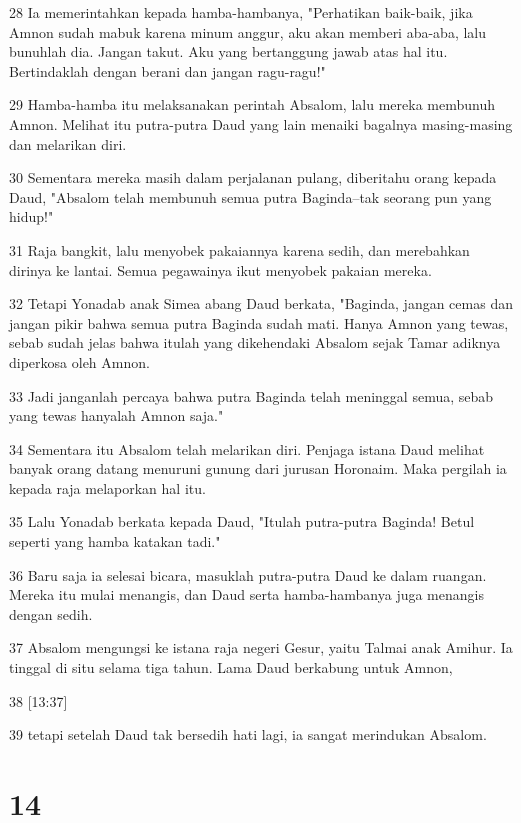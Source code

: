 \par 28 Ia memerintahkan kepada hamba-hambanya, "Perhatikan baik-baik, jika Amnon sudah mabuk karena minum anggur, aku akan memberi aba-aba, lalu bunuhlah dia. Jangan takut. Aku yang bertanggung jawab atas hal itu. Bertindaklah dengan berani dan jangan ragu-ragu!"
\par 29 Hamba-hamba itu melaksanakan perintah Absalom, lalu mereka membunuh Amnon. Melihat itu putra-putra Daud yang lain menaiki bagalnya masing-masing dan melarikan diri.
\par 30 Sementara mereka masih dalam perjalanan pulang, diberitahu orang kepada Daud, "Absalom telah membunuh semua putra Baginda--tak seorang pun yang hidup!"
\par 31 Raja bangkit, lalu menyobek pakaiannya karena sedih, dan merebahkan dirinya ke lantai. Semua pegawainya ikut menyobek pakaian mereka.
\par 32 Tetapi Yonadab anak Simea abang Daud berkata, "Baginda, jangan cemas dan jangan pikir bahwa semua putra Baginda sudah mati. Hanya Amnon yang tewas, sebab sudah jelas bahwa itulah yang dikehendaki Absalom sejak Tamar adiknya diperkosa oleh Amnon.
\par 33 Jadi janganlah percaya bahwa putra Baginda telah meninggal semua, sebab yang tewas hanyalah Amnon saja."
\par 34 Sementara itu Absalom telah melarikan diri. Penjaga istana Daud melihat banyak orang datang menuruni gunung dari jurusan Horonaim. Maka pergilah ia kepada raja melaporkan hal itu.
\par 35 Lalu Yonadab berkata kepada Daud, "Itulah putra-putra Baginda! Betul seperti yang hamba katakan tadi."
\par 36 Baru saja ia selesai bicara, masuklah putra-putra Daud ke dalam ruangan. Mereka itu mulai menangis, dan Daud serta hamba-hambanya juga menangis dengan sedih.
\par 37 Absalom mengungsi ke istana raja negeri Gesur, yaitu Talmai anak Amihur. Ia tinggal di situ selama tiga tahun. Lama Daud berkabung untuk Amnon,
\par 38 [13:37]
\par 39 tetapi setelah Daud tak bersedih hati lagi, ia sangat merindukan Absalom.

\chapter{14}

